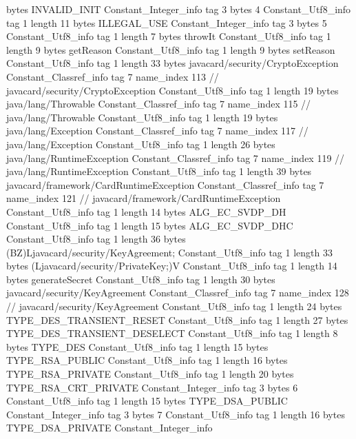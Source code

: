 {{{			bytes	INVALID_INIT
		}
		Constant_Integer_info {
			tag	3
			bytes	4
		}
		Constant_Utf8_info {
			tag	1
			length	11
			bytes	ILLEGAL_USE
		}
		Constant_Integer_info {
			tag	3
			bytes	5
		}
		Constant_Utf8_info {
			tag	1
			length	7
			bytes	throwIt
		}
		Constant_Utf8_info {
			tag	1
			length	9
			bytes	getReason
		}
		Constant_Utf8_info {
			tag	1
			length	9
			bytes	setReason
		}
		Constant_Utf8_info {
			tag	1
			length	33
			bytes	javacard/security/CryptoException
		}
		Constant_Classref_info {
			tag	7
			name_index	113		// javacard/security/CryptoException
		}
		Constant_Utf8_info {
			tag	1
			length	19
			bytes	java/lang/Throwable
		}
		Constant_Classref_info {
			tag	7
			name_index	115		// java/lang/Throwable
		}
		Constant_Utf8_info {
			tag	1
			length	19
			bytes	java/lang/Exception
		}
		Constant_Classref_info {
			tag	7
			name_index	117		// java/lang/Exception
		}
		Constant_Utf8_info {
			tag	1
			length	26
			bytes	java/lang/RuntimeException
		}
		Constant_Classref_info {
			tag	7
			name_index	119		// java/lang/RuntimeException
		}
		Constant_Utf8_info {
			tag	1
			length	39
			bytes	javacard/framework/CardRuntimeException
		}
		Constant_Classref_info {
			tag	7
			name_index	121		// javacard/framework/CardRuntimeException
		}
		Constant_Utf8_info {
			tag	1
			length	14
			bytes	ALG_EC_SVDP_DH
		}
		Constant_Utf8_info {
			tag	1
			length	15
			bytes	ALG_EC_SVDP_DHC
		}
		Constant_Utf8_info {
			tag	1
			length	36
			bytes	(BZ)Ljavacard/security/KeyAgreement;
		}
		Constant_Utf8_info {
			tag	1
			length	33
			bytes	(Ljavacard/security/PrivateKey;)V
		}
		Constant_Utf8_info {
			tag	1
			length	14
			bytes	generateSecret
		}
		Constant_Utf8_info {
			tag	1
			length	30
			bytes	javacard/security/KeyAgreement
		}
		Constant_Classref_info {
			tag	7
			name_index	128		// javacard/security/KeyAgreement
		}
		Constant_Utf8_info {
			tag	1
			length	24
			bytes	TYPE_DES_TRANSIENT_RESET
		}
		Constant_Utf8_info {
			tag	1
			length	27
			bytes	TYPE_DES_TRANSIENT_DESELECT
		}
		Constant_Utf8_info {
			tag	1
			length	8
			bytes	TYPE_DES
		}
		Constant_Utf8_info {
			tag	1
			length	15
			bytes	TYPE_RSA_PUBLIC
		}
		Constant_Utf8_info {
			tag	1
			length	16
			bytes	TYPE_RSA_PRIVATE
		}
		Constant_Utf8_info {
			tag	1
			length	20
			bytes	TYPE_RSA_CRT_PRIVATE
		}
		Constant_Integer_info {
			tag	3
			bytes	6
		}
		Constant_Utf8_info {
			tag	1
			length	15
			bytes	TYPE_DSA_PUBLIC
		}
		Constant_Integer_info {
			tag	3
			bytes	7
		}
		Constant_Utf8_info {
			tag	1
			length	16
			bytes	TYPE_DSA_PRIVATE
		}
		Constant_Integer_info {
}}}
